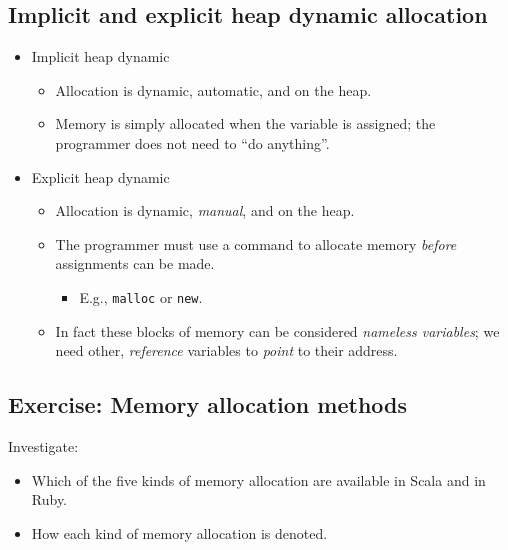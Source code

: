 \documentclass[11pt]{article}
\theoremstyle{definition}
\begin{document}
\subsection{Implicit and explicit heap dynamic allocation}
\label{sec:org9b41642}
\begin{itemize}
\item Implicit heap dynamic
\begin{itemize}
\item Allocation is dynamic, automatic, and on the heap.
\item Memory is simply allocated when the variable is assigned;
the programmer does not need to “do anything”.
\end{itemize}
\item Explicit heap dynamic
\begin{itemize}
\item Allocation is dynamic, \emph{manual}, and on the heap.
\item The programmer must use a command to allocate memory
\emph{before} assignments can be made.
\begin{itemize}
\item E.g., \texttt{malloc} or \texttt{new}.
\end{itemize}
\item In fact these blocks of memory can be considered
\emph{nameless variables}; we need other,
\emph{reference} variables to \emph{point} to their address.
\end{itemize}
\end{itemize}

\subsection{Exercise: Memory allocation methods}
\label{sec:orgad1b70d}
Investigate:
\begin{itemize}
\item Which of the five kinds of memory allocation are available in
Scala and in Ruby.
\item How each kind of memory allocation is denoted.
\end{itemize}
\end{document}
